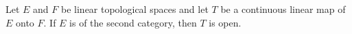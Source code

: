 Let $E$ and $F$ be linear topological spaces and let $T$ be a continuous linear map of $E$ onto $F$. If $E$ is of the second category, then $T$ is open.
